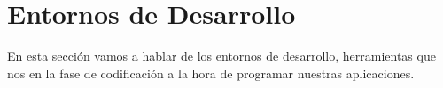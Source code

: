 \section{Entornos de Desarrollo}
En esta sección vamos a hablar de los entornos de desarrollo, herramientas que nos en la fase de codificación a la hora de programar nuestras aplicaciones.

\glsaddall
\printglossaries


\newpage
{}




